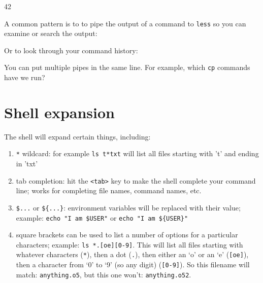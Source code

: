 \begin{prompt}
     42
\end{prompt}

A common pattern is to to pipe the output of a command to \lstinline|less| so you can
examine or search the output:

\begin{prompt}
\end{prompt}

Or to look through your command history:

\begin{prompt}
\end{prompt}

You can put multiple pipes in the same line. For example, which \lstinline|cp| commands have we run?

\begin{prompt}
\end{prompt}

\section{Shell expansion}

The shell will expand certain things, including:

\begin{enumerate}
\item \lstinline|*| wildcard: for example \lstinline|ls t*txt| will list all files starting with 't' and ending in 'txt'
\item tab completion: hit the \lstinline|<tab>| key to make the shell complete your command line; works for completing file names, command names, etc.
\item \lstinline|$...| or \lstinline|${...}|: environment variables will be replaced with their value;
example: \lstinline|echo "I am $USER"| or \lstinline|echo "I am ${USER}"|
\item square brackets can be used to list a number of options for a particular characters; example: \lstinline|ls *.[oe][0-9]|.
This will list all files starting with whatever characters (\lstinline|*|), then a dot (\lstinline|.|), then either
an `o' or an `e' (\lstinline|[oe]|), then a character from `0' to `9' (so any digit) (\lstinline|[0-9]|).
So this filename will match: \lstinline|anything.o5|, but this one won't: \lstinline|anything.o52|.

\end{enumerate}

